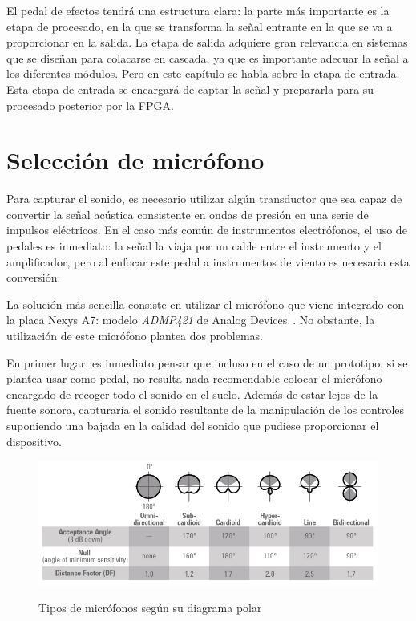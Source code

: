 El pedal de efectos tendrá una estructura clara: la parte más importante es la etapa de procesado, en la que se transforma la señal entrante en la que se va a proporcionar en la salida. La etapa de salida adquiere gran relevancia en sistemas que se diseñan para colacarse en cascada, ya que es importante adecuar la señal a los diferentes módulos. Pero en este capítulo se habla sobre la etapa de entrada. Esta etapa de entrada se encargará de captar la señal y prepararla para su procesado posterior por la FPGA.

\section{Selección de micrófono}

Para capturar el sonido, es necesario utilizar algún transductor que sea capaz de convertir la señal acústica consistente en ondas de presión en una serie de impulsos eléctricos. En el caso más común de instrumentos electrófonos, el uso de pedales es inmediato: la señal la viaja por un cable entre el instrumento y el amplificador, pero al enfocar este pedal a instrumentos de viento es necesaria esta conversión.

La solución más sencilla consiste en utilizar el micrófono que viene integrado con la placa Nexys A7: modelo \emph{ADMP421} de Analog Devices~\cite{Nexys}. No obstante, la utilización de este micrófono plantea dos problemas.

En primer lugar, es inmediato pensar que incluso en el caso de un prototipo, si se plantea usar como pedal, no resulta nada recomendable colocar el micrófono encargado de recoger todo el sonido en el suelo. Además de estar lejos de la fuente sonora, capturaría el sonido resultante de la manipulación de los controles suponiendo una bajada en la calidad del sonido que pudiese proporcionar el dispositivo.

\begin{figure}
\begin{center}
\label{fig:polar_dig}
\includegraphics[width=15cm]{img/micros.png}
\caption{Tipos de micrófonos según su diagrama polar~\cite{Mic}}
\end{center}
\end{figure}

